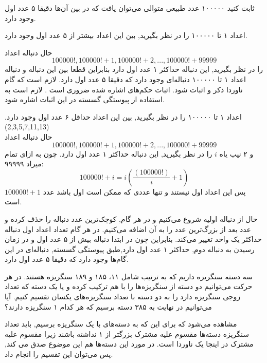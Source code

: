 \documentclass[11pt,largemargins]{h2wp}
\begin{document}
ثابت کنید ۱۰۰۰۰۰ عدد طبیعی متوالی می‌توان یافت که در بین آن‌ها دقیقا ۵ عدد اول وجود دارد.
\solution

اعداد ۱ تا ۱۰۰۰۰۰ را در نظر بگیرید, بین این اعداد بیشتر از ۵ عدد اول وجود دارد.

 حال دنباله اعداد
\[100000!, 100000!+1,100000!+2 ,..., 100000!+99999\]
را در نظر بگیرید, این دنباله حداکثر ۱ عدد اول دارد
بنابراین قطعا بین این دنباله و دنباله اعداد ۱ تا ۱۰۰۰۰۰ دنباله‌ای وجود دارد
 که دقیقا ۵ عدد اول دارد.
\notes
{}
لازم است که گام ناوردا ذکر و اثبات شود.
اثبات حکم‌های اشاره شده ضروری است .
لازم است به استفاده از پیوستگی گسسته در این اثبات اشاره شود.

اعداد ۱ تا ۱۰۰۰۰۰ را در نظر بگیرید, بین این اعداد حداقل ۶ عدد اول وجود دارد.(2,3,5,7,11,13)
\\
 حال دنباله اعداد
\[100000!, 100000!+1,100000!+2 ,..., 100000!+99999\]
را در نظر بگیرید, این دنباله حداکثر ۱ عدد اول دارد. چون به ازای تمام ‭‭$i$ 
های بین ۲ و ۹۹۹۹۹ داریم: 
\[100000!+i=i(\dfrac{(100000!)}{i} +1)\]
پس این اعداد اول نیستند و تنها عددی که ممکن است اول باشد عدد 
$100000!+1$
است.


 حال از دنباله اولیه شروع می‌کنیم و در هر گام, کوچک‌ترین عدد دنباله را حذف کرده و عدد بعد از بزرگ‌ترین عدد را به آن اضافه می‌کنیم. در هر گام تعداد اعداد اول دنباله حداکثر یک واحد تغییر می‌کند. بنابراین چون در ابتدا دنباله بیش از ۵ عدد اول و در زمان رسیدن به دنباله دوم, حداکثر ۱ عدد اول دارد,طبق پیوستگی گسسته, دنباله‌ای در این گام‌ها وجود دارد که دقیقا ۵ عدد اول دارد.
 
 
\question

سه دسته سنگریزه داریم که به ترتیب شامل ۱۱، ۱۸۵ و ۱۸۹ سنگریزه هستند. در هر حرکت می‌توانیم دو دسته از سنگریزه‌ها را با هم ترکیب کرده و یا یک دسته که تعداد زوجی سنگریزه دارد را به دو دسته با تعداد سنگریزه‌های یکسان تقسیم کنیم. 
آیا می‌توانیم در نهایت به ۳۸۵ دسته برسیم که هر کدام ۱ سنگریزه دارند؟
\solution

مشاهده می‌شود که برای این که به دسته‌های با یک سنگریزه برسیم, باید تعداد سنگریزه دسته‌ها مقسوم علیه مشترک بزرگتر از ۱ نداشته باشند زیرا مقسوم علیه مشترک در اینجا یک ناوردا است. در مورد این دسته‌ها هم این موضوع صدق می کند, 
پس می‌توان این تقسیم را انجام داد.
\notes
\\%
\\%
\end{document}

